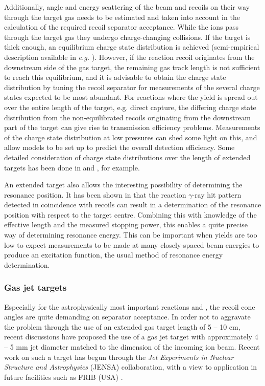 Additionally, angle and energy scattering of the beam and recoils on their way through the target gas needs to be estimated and taken into account in the calculation of the required recoil separator acceptance. While the ions pass through the target gas they undergo charge-changing collisions. If the target is thick enough, an equilibrium charge state distribution is achieved (semi-empirical description available in {\it e.g.} \cite{liu03}). However, if the reaction recoil originates from the downstream side of the gas target, the remaining gas track length is not sufficient to reach this equilibrium, and it is advisable to obtain the charge state distribution by tuning the recoil separator for measurements of the several charge states expected to be most abundant. For reactions where the yield is spread out over the entire length of the target, e.g. direct capture, the differing charge state distribution from the non-equilibrated recoils originating from the downstream part of the target can give rise to transmission efficiency problems. Measurements of the charge state distribution at low pressures can shed some light on this, and allow models to be set up to predict the overall detection efficiency. Some detailed consideration of charge state distributions over the length of extended targets has been done in \cite{sch04} and \cite{zyl07}, for example.

An extended target also allows the interesting possibility of determining the resonance position. It has been shown in \cite{hut12} that the reaction $\gamma$-ray hit pattern detected in coincidence with recoils can result in a determination of the resonance position with respect to the target centre. Combining this with knowledge of the effective length and the measured stopping power, this enables a quite precise way of determining resonance energy. This can be important when yields are too low to expect measurements to be made at many closely-spaced beam energies to produce an excitation function, the usual method of resonance energy determination. 


\subsubsection{Gas jet targets}
Especially for the astrophysically most important reactions \reac{\alpha}{\gamma} and \reac{\alpha}{\gamma}, the recoil cone angles are quite demanding on separator acceptance. In order not to aggravate the problem through the use of an extended gas target length of 5 -- 10 cm, recent discussions have proposed the use of a gas jet target with approximately 4 -- 5 mm jet diameter matched to the dimension of the incoming ion beam. Recent work on such a target has begun through the {\em Jet Experiments in Nuclear Structure and Astrophysics} (JENSA) collaboration, with a view to application in future facilities such as FRIB (USA) \cite{chi13}. 

